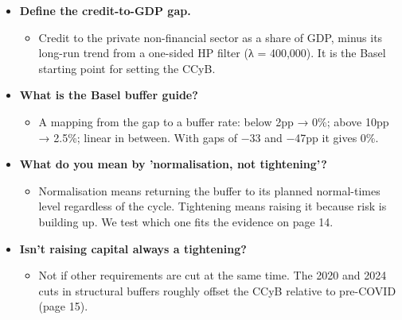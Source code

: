 \documentclass[10pt]{article}
\begin{document}
\begin{tcolorbox}[sbox,width=0.495\linewidth,height=14.6cm,nobeforeafter,box align=top,fit basedim=11pt,colframe=nlred!70,colbacktitle=nlred!8,coltitle=nlred,title=LIKELY CHALLENGES · definitions and logic]
\begin{itemize}
\item[\textcolor{navy}{\textbf{Q}}] \textbf{Define the credit-to-GDP gap.}
\begin{itemize}
\item Credit to the private non-financial sector as a share of GDP, minus its long-run trend from a one-sided HP filter (λ = 400,000). It is the Basel starting point for setting the CCyB.
\end{itemize}
\item[\textcolor{navy}{\textbf{Q}}] \textbf{What is the Basel buffer guide?}
\begin{itemize}
\item A mapping from the gap to a buffer rate: below 2pp → 0\%; above 10pp → 2.5\%; linear in between. With gaps of −33 and −47pp it gives 0\%.
\end{itemize}
\item[\textcolor{navy}{\textbf{Q}}] \textbf{What do you mean by 'normalisation, not tightening'?}
\begin{itemize}
\item Normalisation means returning the buffer to its planned normal-times level regardless of the cycle. Tightening means raising it because risk is building up. We test which one fits the evidence on page 14.
\end{itemize}
\item[\textcolor{navy}{\textbf{Q}}] \textbf{Isn't raising capital always a tightening?}
\begin{itemize}
\item Not if other requirements are cut at the same time. The 2020 and 2024 cuts in structural buffers roughly offset the CCyB relative to pre-COVID (page 15).
\end{itemize}
\end{itemize}
\end{tcolorbox}
\newpage
\end{document}
